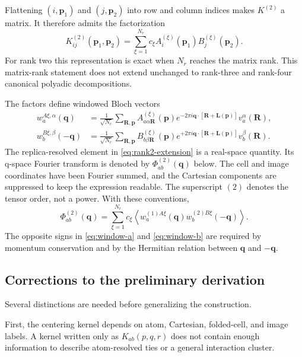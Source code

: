 \documentclass{article}
\newcommand{\Nc}{N_c}
\begin{document}
Flattening $(i,\bm p_1)$ and $(j,\bm p_2)$ into row and column indices makes
$K^{(2)}$ a matrix. It therefore admits the factorization
\begin{equation}
    K^{(2)}_{ij}(\bm p_1,\bm p_2)
    =
    \sum_{\xi=1}^{N_r}
    c_\xi A_i^{(\xi)}(\bm p_1)
    B_j^{(\xi)}(\bm p_2).
    \label{eq:rank2-factorization}
\end{equation}
For rank two this representation is exact when $N_r$ reaches the matrix
rank. This matrix-rank statement does not extend unchanged to rank-three
and rank-four canonical polyadic decompositions.

The factors define windowed Bloch vectors
\begin{align}
    w_a^{A\xi,\alpha}(\bm q)
    &=
    \frac{1}{\sqrt{\Nc}}
    \sum_{\bm R,\bm p}
    A_{a\alpha\bm R}^{(\xi)}(\bm p)
    e^{-2\pi i\bm q\cdot[\bm R+\bm L(\bm p)]}
    v_a^\alpha(\bm R),                                      \label{eq:window-a}\\
    w_b^{B\xi,\beta}(-\bm q)
    &=
    \frac{1}{\sqrt{\Nc}}
    \sum_{\bm R,\bm p}
    B_{b\beta\bm R}^{(\xi)}(\bm p)
    e^{+2\pi i\bm q\cdot[\bm R+\bm L(\bm p)]}
    v_b^\beta(\bm R).                                      \label{eq:window-b}
\end{align}
The replica-resolved element in
\autoref{eq:rank2-extension} is a real-space quantity. Its q-space Fourier
transform is denoted by $\varPhi^{(2)}_{ab}(\bm q)$ below. The cell and image
coordinates have been Fourier summed, and the Cartesian components are
suppressed to keep the expression readable. The superscript $(2)$ denotes
the tensor order, not a power. With these conventions,
\begin{equation}
    \varPhi^{(2)}_{ab}(\bm q)
    =
    \sum_{\xi=1}^{N_r}c_\xi
    \left\langle
    w_a^{(1)A\xi}(\bm q)
    w_b^{(2)B\xi}(-\bm q)
    \right\rangle .
    \label{eq:phi2-interp}
\end{equation}
The opposite signs in \autoref{eq:window-a} and
\autoref{eq:window-b} are required by momentum conservation and by the
Hermitian relation between $\bm q$ and $-\bm q$.

\subsection{Corrections to the preliminary derivation}
\label{sec:corrections}

Several distinctions are needed before generalizing the construction.

First, the centering kernel depends on atom, Cartesian, folded-cell, and
image labels. A kernel written only as $K_{ab}(p,q,r)$ does not contain
enough information to describe atom-resolved ties or a general interaction
cluster.
\end{document}
